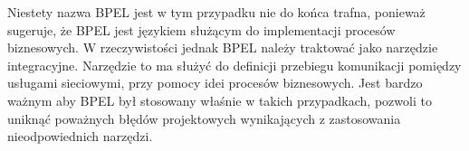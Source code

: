 Niestety nazwa BPEL jest w tym przypadku nie do końca trafna, ponieważ sugeruje, że BPEL jest językiem służącym do implementacji procesów biznesowych. W rzeczywistości jednak BPEL należy traktować jako narzędzie integracyjne. Narzędzie to ma służyć do definicji przebiegu komunikacji pomiędzy usługami sieciowymi, przy pomocy idei procesów biznesowych. Jest bardzo ważnym aby BPEL był stosowany właśnie w takich przypadkach, pozwoli to uniknąć poważnych błędów projektowych wynikających z zastosowania nieodpowiednich narzędzi.  
